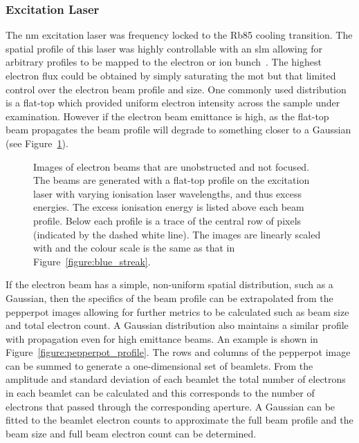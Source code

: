 \subsubsection{Excitation Laser}
The \unit[780]{nm} excitation laser was frequency locked to the Rb85 cooling transition.
The spatial profile of this laser was highly controllable with an \gls{slm} allowing for arbitrary profiles to be mapped to the electron or ion bunch~\cite{mcculloch_arbitrarily_2011}.
The highest electron flux could be obtained by simply saturating the \gls{mot} but that limited control over the electron beam profile and size.
One commonly used distribution is a flat-top which provided uniform electron intensity across the sample under examination.
However if the electron beam emittance is high, as the flat-top beam propagates the beam profile will degrade to something closer to a Gaussian (see Figure~\ref{figure:flat_top}).

\begin{figure}
    \center
    
    \caption[Blurring of flat-top electron profile with emittance.]{Images of electron beams that are unobstructed and not focused. The beams are generated with a flat-top profile on the excitation laser with varying ionisation laser wavelengths, and thus excess energies. The excess ionisation energy is listed above each beam profile. Below each profile is a trace of the central row of pixels (indicated by the dashed white line). The images are linearly scaled with and the colour scale is the same as that in Figure~\ref{figure:blue_streak}.}
    \label{figure:flat_top}
\end{figure}

If the electron beam has a simple, non-uniform spatial distribution, such as a Gaussian, then the specifics of the beam profile can be extrapolated from the pepperpot images allowing for further metrics to be calculated such as beam size and total electron count.
A Gaussian distribution also maintains a similar profile with propagation even for high emittance beams.
An example is shown in Figure~\ref{figure:pepperpot_profile}.
The rows and columns of the pepperpot image can be summed to generate a one-dimensional set of beamlets.
From the amplitude and standard deviation of each beamlet the total number of electrons in each beamlet can be calculated and this corresponds to the number of electrons that passed through the corresponding aperture.
A Gaussian can be fitted to the beamlet electron counts to approximate the full beam profile and the beam size and full beam electron count can be determined.

